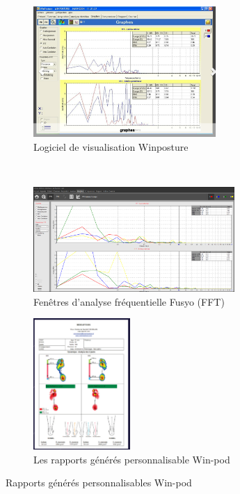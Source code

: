\begin{figure}[H]
    \centering
    \begin{subfigure}[b]{0.45\textwidth}
      \centering
      \includegraphics[height=5cm]{images/pression_plantaire/winposture2.png}
    \caption{Logiciel de visualisation Winposture}\label{fig: Logiciel Winposture}
    \end{subfigure}\\
    \begin{subfigure}[b]{0.45\textwidth}
      \centering
      \includegraphics[height=4cm]{images/analyse_marche/FFT.png}
      \caption{Fenêtres d’analyse fréquentielle Fusyo (FFT)}\label{fig:FFT}
    \end{subfigure}
    \begin{subfigure}[b]{0.45\textwidth}
      \centering
      \includegraphics[height=5cm]{images/analyse_marche/WinPod4.png}
    \caption{Les rapports générés personnalisable Win-pod}\label{fig:WinPod4}
    \end{subfigure}
    \caption{Rapports générés personnalisables Win-pod}\label{fig:global2}
  \end{figure}
